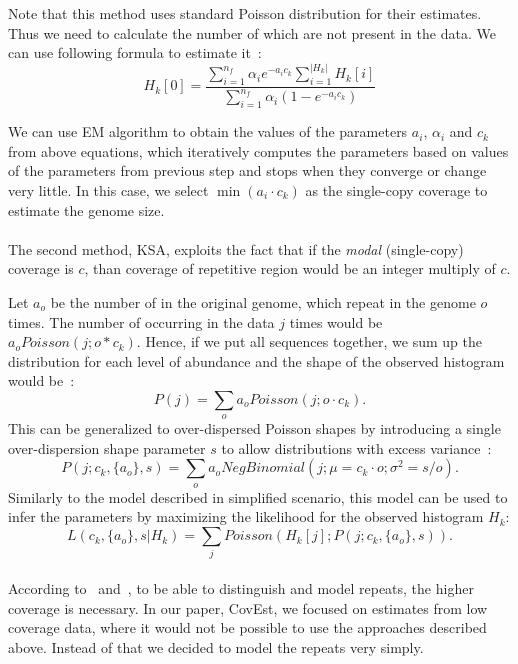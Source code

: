 Note that this method uses standard Poisson distribution for their estimates. Thus we need to calculate the number of \kmers which are not present in the data. We can use following formula to estimate it~\cite{waterman}:
$$H_k[0] = \frac{\displaystyle\sum_{i=1}^{n_f}\alpha_i e^{-a_i c_k} \sum_{i=1}^{|H_k|}H_k[i]}{\displaystyle\sum_{i=1}^{n_f}\alpha_i\left(1 - e^{-a_i c_k}\right)}$$

We can use EM algorithm to obtain the values of the parameters $a_i,\, \alpha_i$ and $c_k$ from above equations, which iteratively computes the parameters based on values of the parameters from previous step and stops when they converge or change very little. In this case, we select $\min(a_i \cdot c_k)$ as the single-copy coverage to estimate the genome size.

\paragraph{}The second method, KSA\cite{williams}, exploits the fact that if the \emph{modal} (single-copy) coverage is $c$, than coverage of repetitive region would be an integer multiply of $c$.

Let $a_o$ be the number of \kmers in the original genome, which repeat in the genome $o$ times.
The number of \kmers occurring in the data $j$ times would be $a_o Poisson(j; o*c_k)$. Hence, if we put all sequences together, we sum up the distribution for each level of abundance and the shape of the observed \kmer histogram would be~\cite{williams}:
$$P(j) = \sum_o a_o Poisson(j; o\cdot c_k).$$
This can be generalized to over-dispersed Poisson shapes by introducing a single over-dispersion shape parameter $s$ to allow distributions with excess variance~\cite{williams}:
$$P(j; c_k, \{a_o\}, s) = \sum_o a_o NegBinomial(j; \mu=c_k\cdot o;\sigma^2=s/o).$$
Similarly to the model described in simplified scenario, this model can be used to infer the parameters by maximizing the likelihood for the observed histogram $H_k$:
$$L(c_k, \{a_o\}, s | H_k) = \sum_j Poisson(H_k[j]; P(j; c_k, \{a_o\}, s)).$$

\paragraph{} According to~\cite{waterman} and~\cite{williams}, to be able to distinguish and model repeats, the higher coverage is necessary. In our paper, CovEst\cite{covest}, we focused on estimates from low coverage data, where it would not be possible to use the approaches described above. Instead of that we decided to model the repeats very simply.

